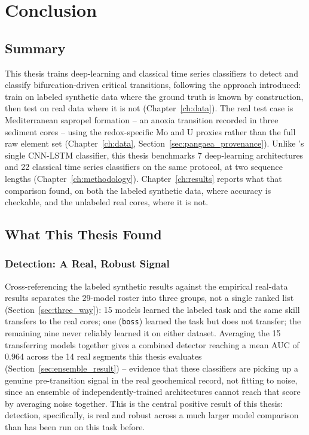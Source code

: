 \chapter{Conclusion}
\label{ch:conclusion}

\section{Summary}
This thesis trains deep-learning and classical time series classifiers to detect and classify bifurcation-driven critical transitions, following the approach \citet{bury2021} introduced: train on labeled synthetic data where the ground truth is known by construction, then test on real data where it is not (Chapter~\ref{ch:data}). The real test case is Mediterranean sapropel formation -- an anoxia transition recorded in three sediment cores -- using the redox-specific Mo and U proxies rather than the full raw element set (Chapter~\ref{ch:data}, Section~\ref{sec:pangaea_provenance}). Unlike \citet{bury2021}'s single CNN-LSTM classifier, this thesis benchmarks 7 deep-learning architectures and 22 classical time series classifiers on the same protocol, at two sequence lengths (Chapter~\ref{ch:methodology}). Chapter~\ref{ch:results} reports what that comparison found, on both the labeled synthetic data, where accuracy is checkable, and the unlabeled real cores, where it is not.

\section{What This Thesis Found}

\subsection{Detection: A Real, Robust Signal}
Cross-referencing the labeled synthetic results against the empirical real-data results separates the 29-model roster into three groups, not a single ranked list (Section~\ref{sec:three_way}): 15 models learned the labeled task and the same skill transfers to the real cores; one (\texttt{boss}) learned the task but does not transfer; the remaining nine never reliably learned it on either dataset. Averaging the 15 transferring models together gives a combined detector reaching a mean AUC of 0.964 across the 14 real segments this thesis evaluates (Section~\ref{sec:ensemble_result}) -- evidence that these classifiers are picking up a genuine pre-transition signal in the real geochemical record, not fitting to noise, since an ensemble of independently-trained architectures cannot reach that score by averaging noise together. This is the central positive result of this thesis: detection, specifically, is real and robust across a much larger model comparison than has been run on this task before.

